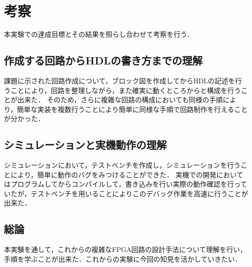\documentclass[a4paper,11pt]{ltjsarticle}
\begin{document}
\section{考察}
本実験での達成目標とその結果を照らし合わせて考察を行う．
\subsection{作成する回路からHDLの書き方までの理解}
課題に示された回路作成について，ブロック図を作成してからHDLの記述を行うことにより，回路を整理しながら，また確実に動くところからと構成を行うことが出来た．
そのため，さらに複雑な回路の構成においても同様の手順により，簡単な実装を複数行うことにより簡単に同様な手順で回路制作を行えることが分かった．
\subsection{シミュレーションと実機動作の理解}
シミュレーションにおいて，テストベンチを作成し，シミュレーションを行うことにより，簡単に動作のバグをみつけることができた．
実機での開発においてはプログラムしてからコンパイルして，書き込みを行い実際の動作確認を行っていたが，テストベンチを用いることによりこのデバッグ作業を高速に行うことが出来た．
\subsection{総論}
本実験を通して，これからの複雑なFPGA回路の設計手法について理解を行い，手順を学ぶことが出来た．これからの実験に今回の知見を活かしていきたい．
\end{document}
